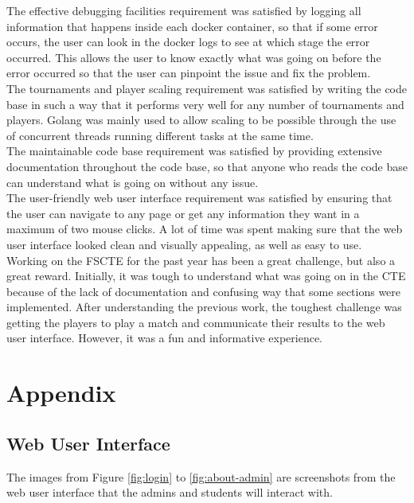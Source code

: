 \documentclass[a4paper, 12pt]{report}
\begin{document}
The effective debugging facilities requirement was satisfied by logging all
information that happens inside each docker container, so that if some error
occurs, the user can look in the docker logs to see at which stage the error
occurred. This allows the user to know exactly what was going on before the
error occurred so that the user can pinpoint the issue and fix the problem. \\

The tournaments and player scaling requirement was satisfied by writing the
code base in such a way that it performs very well for any number of tournaments
and players. Golang was mainly used to allow scaling to be possible through the
use of concurrent threads running different tasks at the same time. \\

The maintainable code base requirement was satisfied by providing extensive
documentation throughout the code base, so that anyone who reads the code base
can understand what is going on without any issue. \\

The user-friendly web user interface requirement was satisfied by ensuring that
the user can navigate to any page or get any information they want in a maximum
of two mouse clicks. A lot of time was spent making sure that the web user
interface looked clean and visually appealing, as well as easy to use. \\

Working on the FSCTE for the past year has been a great challenge, but also a
great reward. Initially, it was tough to understand what was going on in the CTE
because of the lack of documentation and confusing way that some sections were
implemented. After understanding the previous work, the toughest challenge was
getting the players to play a match and communicate their results to the web
user interface. However, it was a fun and informative experience.

\chapter{Appendix}

\section{Web User Interface}

The images from Figure \ref{fig:login} to \ref{fig:about-admin} are screenshots
from the web user interface that the admins and students will interact with.
\vspace{0.4cm}
\end{document}
